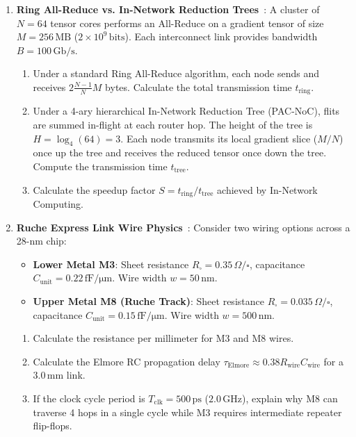 \begin{enumerate}
    \item \textbf{Ring All-Reduce vs. In-Network Reduction Trees}~\cite{Ouyang2026PAC}: A cluster of $N = 64$ tensor cores performs an All-Reduce on a gradient tensor of size $M = 256\,\mathrm{MB}$ ($2 \times 10^9\,\mathrm{bits}$). Each interconnect link provides bandwidth $B = 100\,\mathrm{Gb/s}$.
    \begin{enumerate}
        \item Under a standard Ring All-Reduce algorithm, each node sends and receives $2 \frac{N-1}{N} M$ bytes. Calculate the total transmission time $t_{\mathrm{ring}}$.
        \item Under a 4-ary hierarchical In-Network Reduction Tree (PAC-NoC), flits are summed in-flight at each router hop. The height of the tree is $H = \log_4(64) = 3$. Each node transmits its local gradient slice ($M/N$) once up the tree and receives the reduced tensor once down the tree. Compute the transmission time $t_{\mathrm{tree}}$.
        \item Calculate the speedup factor $S = t_{\mathrm{ring}} / t_{\mathrm{tree}}$ achieved by In-Network Computing.
    \end{enumerate}

    \item \textbf{Ruche Express Link Wire Physics}~\cite{Gao2026}: Consider two wiring options across a 28-nm chip:
    \begin{itemize}
        \item \textbf{Lower Metal M3}: Sheet resistance $R_{\square} = 0.35\,\Omega/\square$, capacitance $C_{\mathrm{unit}} = 0.22\,\mathrm{fF/\mu m}$. Wire width $w = 50\,\mathrm{nm}$.
        \item \textbf{Upper Metal M8 (Ruche Track)}: Sheet resistance $R_{\square} = 0.035\,\Omega/\square$, capacitance $C_{\mathrm{unit}} = 0.15\,\mathrm{fF/\mu m}$. Wire width $w = 500\,\mathrm{nm}$.
    \end{itemize}
    \begin{enumerate}
        \item Calculate the resistance per millimeter for M3 and M8 wires.
        \item Calculate the Elmore RC propagation delay $\tau_{\mathrm{Elmore}} \approx 0.38 R_{\mathrm{wire}} C_{\mathrm{wire}}$ for a $3.0\,\mathrm{mm}$ link.
        \item If the clock cycle period is $T_{\mathrm{clk}} = 500\,\mathrm{ps}$ ($2.0\,\mathrm{GHz}$), explain why M8 can traverse 4 hops in a single cycle while M3 requires intermediate repeater flip-flops.
    \end{enumerate}


\end{enumerate}
